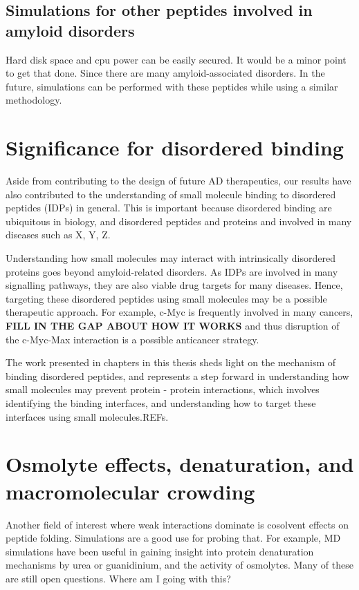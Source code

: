 \subsection{Simulations for other peptides involved in amyloid disorders}
Hard disk space and cpu power can be easily secured.  It would be a minor point to get that done.  Since there are many amyloid-associated disorders. In the future, simulations can be performed with these peptides while using a similar methodology. 


\section{Significance for disordered binding}
Aside from contributing to the design of future AD therapeutics, our results have also contributed to the understanding of small molecule binding to disordered peptides (IDPs) in general. This is important because disordered binding are ubiquitous in biology, and disordered peptides and proteins and involved in many diseases such as X, Y, Z.  

Understanding how small molecules may interact with intrinsically disordered proteins goes beyond amyloid-related disorders. As IDPs are involved in many signalling pathways, they are also viable drug targets for many diseases.   Hence, targeting these disordered peptides using small molecules may be a possible therapeutic approach. For example, c-Myc is frequently involved in many cancers, \textbf{FILL IN THE GAP ABOUT HOW IT WORKS} and thus disruption of the c-Myc-Max interaction is a possible anticancer strategy.\cite{Iakoucheva:2002uv,Metallo:2010p6822,Cuchillo:2012bm}

The work presented in chapters in this thesis sheds light on the mechanism of binding disordered peptides, and represents a step forward in understanding how small molecules may prevent protein - protein interactions, which involves identifying the binding interfaces, and understanding how to target these interfaces using small molecules.REFs.

\section{Osmolyte effects, denaturation, and macromolecular crowding}
Another field of interest where weak interactions dominate is cosolvent effects on peptide folding. Simulations are a good use for probing that.  For example, MD simulations have been useful in gaining insight into protein denaturation mechanisms by urea or guanidinium, and the activity of osmolytes. Many of these are still open questions.\cite{http://pubs.acs.org/doi/abs/10.1021/jp200625k -- crowding and protein association.} Where am I going with this?


